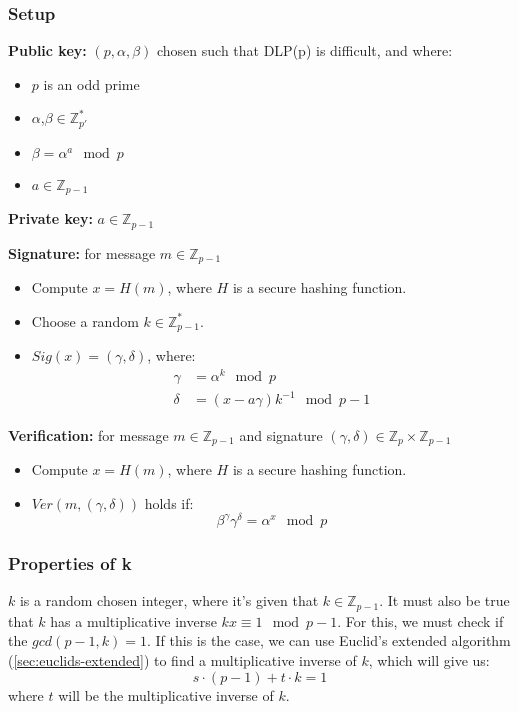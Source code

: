 

\subsubsection*{Setup}
\textbf{Public key:} $(p,\alpha,\beta)$ chosen such that DLP(p) is
difficult, and where:
\begin{itemize}
\item $p$ is an odd prime
\item $\alpha$,$\beta \in \mathbb{Z}_{p'}^*$
\item $\beta = \alpha^a \mod p$
\item $a \in \mathbb{Z}_{p-1} $
\end{itemize}

\textbf{Private key:} $a \in \mathbb{Z}_{p-1}$

\textbf{Signature:} for message $m \in \mathbb{Z}_{p-1}$
\begin{itemize}
\item Compute $x = H(m)$, where $H$ is a secure hashing function.
\item Choose a random $k \in \mathbb{Z}_{p-1}^*$.
\item $Sig(x) = (\gamma,\delta)$, where:
  \begin{align*}
    \gamma &= \alpha^k \mod p \\
    \delta &= (x-a\gamma)k^{-1} \mod p-1
  \end{align*}
\end{itemize}

\textbf{Verification:} for message $m \in \mathbb{Z}_{p-1}$ and
signature $(\gamma,\delta) \in \mathbb{Z}_p\times \mathbb{Z}_{p-1}$
\begin{itemize}
\item Compute $x = H(m)$, where $H$ is a secure hashing function.
\item $Ver(m, (\gamma,\delta))$ holds if:
  \[ \beta^{\gamma} \gamma^{\delta}= \alpha^x \mod p\]
\end{itemize}

\subsubsection*{Properties of k}
$k$ is a random chosen integer, where it's given that $k \in
\mathbb{Z}_{p-1}$. It must also be true that $k$ has a multiplicative
inverse $kx \equiv 1 \mod p - 1$. For this, we must check if the
$gcd(p-1,k) = 1$. If this is the case, we can use Euclid's extended
algorithm (\ref{sec:euclids-extended}) to find a multiplicative
inverse of $k$, which will give us:
\[s \cdot (p-1) + t \cdot k = 1\]
where $t$ will be the multiplicative inverse of $k$.

